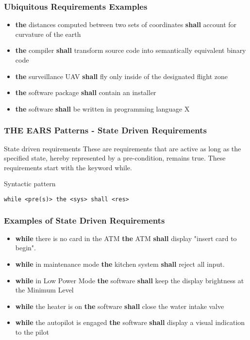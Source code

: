 \documentclass[aspectratio=169]{beamer}
\newcommand{\earsu}[2]{{\bf \color{mypurple}the} {#1} {\bf \color{mypurple}shall} {#2}}
\newcommand{\earss}[3]{{\bf \color{mygreen}while} {#1} {\bf \color{mypurple}the} {#2} {\bf \color{mypurple}shall} {#3}}
\begin{document}
%
\begin{frame}[fragile]
  \frametitle{Ubiquitous Requirements Examples}
  \begin{example}
  \begin{itemize}
    \item \earsu{distances computed between two sets of coordinates}{account for curvature of the earth}    
    \item \earsu{compiler}{transform source code into semantically equivalent binary code}
    \item \earsu{surveillance UAV}{fly only inside of the designated flight zone}
    \item \earsu{software package}{contain an installer}
    \item \earsu{software}{be written in programming language X}
  \end{itemize}
  \end{example}
\end{frame}
%
%
\begin{frame}[fragile]
 \frametitle{THE EARS Patterns - State Driven Requirements}
 \begin{block}{State driven requirements}
  These are requirements that are active as long as the specified state, hereby represented by a pre-condition, remains true. These requirements start with the keyword while.
  \end{block}
  \begin{block}{Syntactic pattern}
  \begin{lstlisting}[language=EARS]
                 while <pre(s)> the <sys> shall <res>
  \end{lstlisting}  
  \end{block}
\end{frame}
%
\begin{frame}
  \frametitle{Examples of State Driven Requirements}
  \begin{example}
  \begin{itemize}
    \item \earss{there is no card in the ATM}{ATM}{display "insert card to begin"}.
    \item \earss{in maintenance mode}{kitchen system}{reject all input}.
    \item \earss{in Low Power Mode}{software}{keep the display brightness at the Minimum Level}
    \item \earss{the heater is on}{software}{close the water intake valve}
    \item \earss{the autopilot is engaged}{software}{display a visual indication to the pilot}
  \end{itemize}
 \end{example}
\end{frame}
\end{document}
